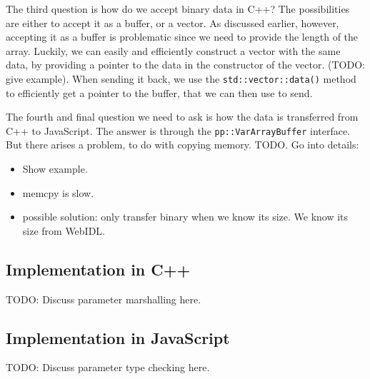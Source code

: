 The third question is how do we accept binary data in C++? The possibilities are either to accept it as a buffer, or a vector. As discussed earlier, however, accepting it as a buffer is problematic since we need to provide the length of the array. Luckily, we can easily and efficiently construct a vector with the same data, by providing a pointer to the data in the constructor of the vector. (TODO: give example). When sending it back, we use the \lstinline{std::vector::data()} method to efficiently get a pointer to the buffer, that we can then use to send.

The fourth and final question we need to ask is how the data is transferred from C++ to JavaScript. The answer is through the \lstinline{pp::VarArrayBuffer} interface. But there arises a problem, to do with copying memory. TODO. Go into details:
\begin{itemize}
	\item Show example.
	\item memcpy is slow.
	\item possible solution: only transfer binary when we know its size. We know its size from WebIDL.
\end{itemize}



\subsection{Implementation in C++} %
\label{sub:webidl_implementation_in_cpp_}
TODO: Discuss parameter marshalling here.

\subsection{Implementation in JavaScript} %
\label{sub:webidl_implementation_in_javascript}
TODO: Discuss parameter type checking here.


